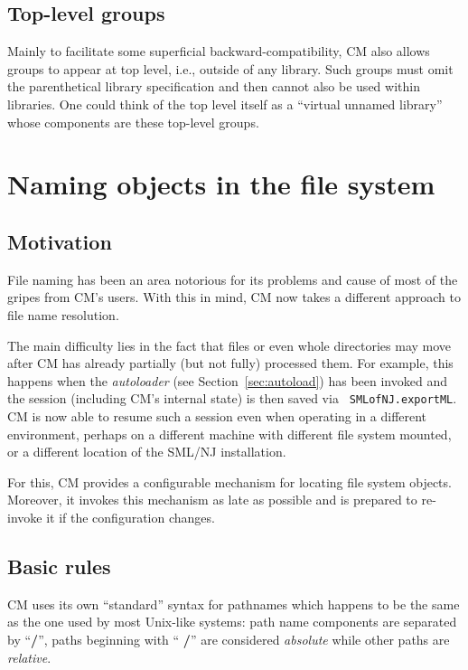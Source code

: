 \documentclass{article}
\begin{document}
\subsection{Top-level groups}

Mainly to facilitate some superficial backward-compatibility, CM also
allows groups to appear at top level, i.e., outside of any library.
Such groups must omit the parenthetical library specification and then
cannot also be used within libraries. One could think of the top level
itself as a ``virtual unnamed library'' whose components are these
top-level groups.

\section{Naming objects in the file system}

\subsection{Motivation}

File naming has been an area notorious for its problems and cause of
most of the gripes from CM's users.  With this in mind, CM now takes a
different approach to file name resolution.

The main difficulty lies in the fact that files or even whole
directories may move after CM has already partially (but not fully)
processed them.  For example, this happens when the {\em autoloader}
(see Section~\ref{sec:autoload}) has been invoked and the session
(including CM's internal state) is then saved via {\tt
SMLofNJ.exportML}.  CM is now able to resume such a session even when
operating in a different environment, perhaps on a different machine
with different file system mounted, or a different location of the
SML/NJ installation.

For this, CM provides a configurable mechanism for locating file
system objects.  Moreover, it invokes this mechanism as late as
possible and is prepared to re-invoke it if the configuration changes.

\subsection{Basic rules}

CM uses its own ``standard'' syntax for pathnames which happens to be
the same as the one used by most Unix-like systems: path name
components are separated by ``{\bf /}'', paths beginning with ``{\bf
/}'' are considered {\em absolute} while other paths are {\em
relative}.
\end{document}
